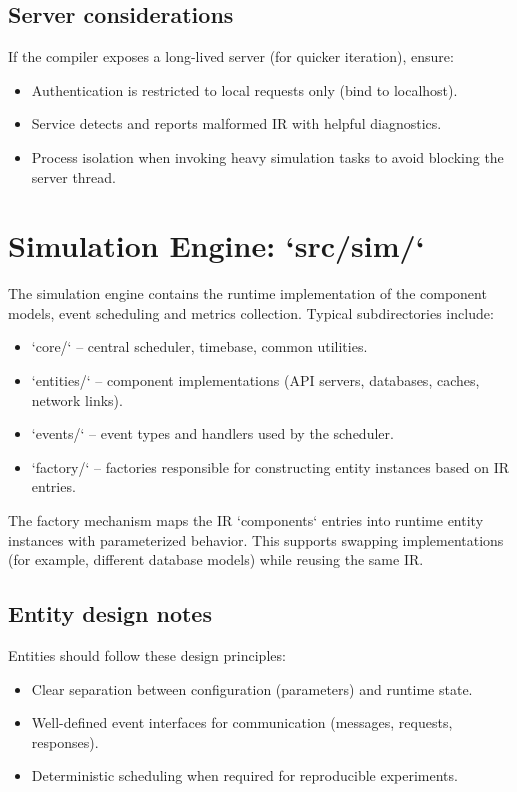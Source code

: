 \documentclass[11pt,a4paper]{article}
\begin{document}
\subsection{Server considerations}
If the compiler exposes a long-lived server (for quicker iteration), ensure:

\begin{itemize}
  \item Authentication is restricted to local requests only (bind to localhost).
  \item Service detects and reports malformed IR with helpful diagnostics.
  \item Process isolation when invoking heavy simulation tasks to avoid blocking the server thread.
\end{itemize}

\newpage

\section{Simulation Engine: `src/sim/`}

The simulation engine contains the runtime implementation of the component models, event scheduling and metrics collection. Typical subdirectories include:

\begin{itemize}
  \item `core/` -- central scheduler, timebase, common utilities.
  \item `entities/` -- component implementations (API servers, databases, caches, network links).
  \item `events/` -- event types and handlers used by the scheduler.
  \item `factory/` -- factories responsible for constructing entity instances based on IR entries.
\end{itemize}

The factory mechanism maps the IR `components` entries into runtime entity instances with parameterized behavior. This supports swapping implementations (for example, different database models) while reusing the same IR.

\subsection{Entity design notes}

Entities should follow these design principles:

\begin{itemize}
  \item Clear separation between configuration (parameters) and runtime state.
  \item Well-defined event interfaces for communication (messages, requests, responses).
  \item Deterministic scheduling when required for reproducible experiments.
\end{itemize}
\end{document}
